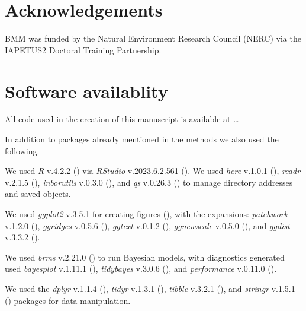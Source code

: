 \documentclass[10pt,a4paper]{article}
\begin{document}
\section{Acknowledgements}\label{acknowledgements}

BMM was funded by the Natural Environment Research Council (NERC) via the IAPETUS2 Doctoral Training Partnership.

\section{Software availablity}\label{software-availablity}

All code used in the creation of this manuscript is available at \ldots{}

In addition to packages already mentioned in the methods we also used the following.

We used \emph{R} v.4.2.2 () via \emph{RStudio} v.2023.6.2.561 ().
We used \emph{here} v.1.0.1 (), \emph{readr} v.2.1.5 (), \emph{inborutils} v.0.3.0 (), and \emph{qs} v.0.26.3 () to manage directory addresses and saved objects.

We used \emph{ggplot2} v.3.5.1 for creating figures (), with the expansions: \emph{patchwork} v.1.2.0 (), \emph{ggridges} v.0.5.6 (), \emph{ggtext} v.0.1.2 (), \emph{ggnewscale} v.0.5.0 (), and \emph{ggdist} v.3.3.2 ().

We used \emph{brms} v.2.21.0 () to run Bayesian models, with diagnostics generated used \emph{bayesplot} v.1.11.1 (), \emph{tidybayes} v.3.0.6 (), and \emph{performance} v.0.11.0 ().

We used the \emph{dplyr} v.1.1.4 (), \emph{tidyr} v.1.3.1 (), \emph{tibble} v.3.2.1 (), and \emph{stringr} v.1.5.1 () packages for data manipulation.
\end{document}
